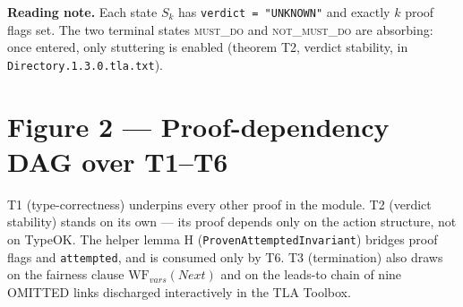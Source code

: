 \documentclass[10pt,a4paper]{article}
\begin{document}
\vspace{2pt}

\noindent\textbf{Reading note.} Each state $S_k$ has \texttt{verdict =
"UNKNOWN"} and exactly $k$ proof flags set. The two terminal states
\textsc{must\_do} and \textsc{not\_must\_do} are absorbing: once entered, only
stuttering is enabled (theorem T2, verdict stability, in
\texttt{Directory.1.3.0.tla.txt}).

\clearpage


\section*{Figure 2 — Proof-dependency DAG over T1–T6}

T1 (type-correctness) underpins every other proof in the module.
T2 (verdict stability) stands on its own — its proof depends only on
the action structure, not on TypeOK. The helper lemma H
(\texttt{ProvenAttemptedInvariant}) bridges proof flags and
\texttt{attempted}, and is consumed only by T6. T3 (termination) also
draws on the fairness clause $\mathrm{WF}_{\mathit{vars}}(\textit{Next})$
and on the leads-to chain of nine OMITTED links discharged
interactively in the TLA Toolbox.

\vspace{4pt}
\end{document}
